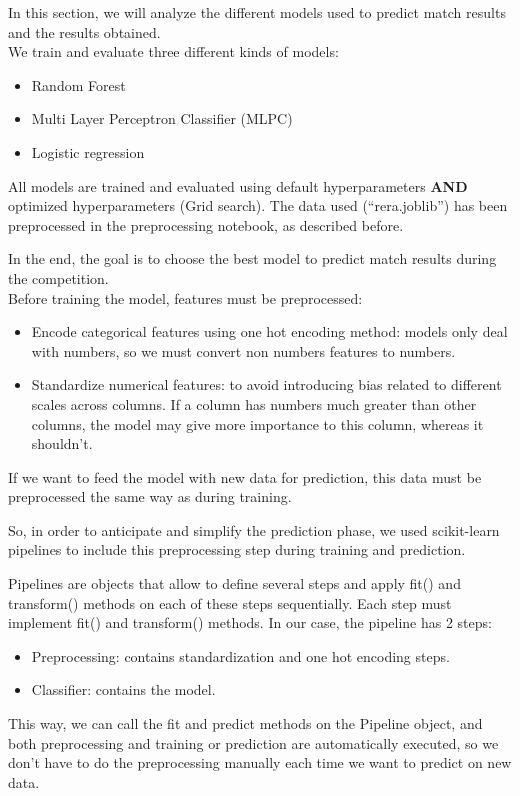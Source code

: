 \documentclass[a4paper,12pt]{article}
\begin{document}
In this section, we will analyze the different models used to predict match results and the results obtained.\\
We train and evaluate three different kinds of models:
\begin{itemize}
    \item Random Forest
    \item Multi Layer Perceptron Classifier (MLPC)
    \item Logistic regression
\end{itemize}

All models are trained and evaluated using default hyperparameters \textbf{AND} optimized hyperparameters (Grid search).  
The data used (``rera.joblib'') has been preprocessed in the preprocessing notebook, as described before.
  
In the end, the goal is to choose the best model to predict match results during the competition.\\

Before training the model, features must be preprocessed:
\begin{itemize}
    \item Encode categorical features using one hot encoding method: models only deal with numbers, so we must convert non numbers features to numbers.
    \item Standardize numerical features: to avoid introducing bias related to different scales across columns. If a column has numbers much greater than other columns, the model may give more importance to this column, whereas it shouldn't.
\end{itemize}
If we want to feed the model with new data for prediction, this data must be preprocessed the same way as during training.

So, in order to anticipate and simplify the prediction phase, we used scikit-learn pipelines to include this preprocessing step during training and prediction.

Pipelines are objects that allow to define several steps and apply fit() and transform() methods on each of these steps sequentially. Each step must implement fit() and transform() methods.
In our case, the pipeline has 2 steps:
\begin{itemize}
    \item Preprocessing: contains standardization and one hot encoding steps.
    \item Classifier: contains the model.
\end{itemize}
This way, we can call the fit and predict methods on the Pipeline object, and both preprocessing and training or prediction are automatically executed, so we don't have to do the preprocessing manually each time we want to predict on new data.
\end{document}
